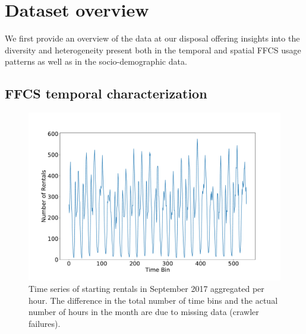 \section{Dataset overview}
\label{sec:datasetoverview}

We first provide an overview of the data at our disposal offering insights into the diversity and heterogeneity present both in the temporal and spatial FFCS usage patterns as well as in the socio-demographic data.  

\subsection{FFCS temporal characterization}

%
\begin{figure}
\begin{center}
            \includegraphics[width=0.65\columnwidth]{figures/temporal_characterization/BookingsHourAnalysisPeriod.pdf}
             \caption{Time series of starting rentals in September 2017 aggregated per hour. The difference in the total number of time bins and the actual number of hours in the month are due to missing data (crawler failures).}
            \label{fig:time_series}
    \end{center}
\end{figure}
%
